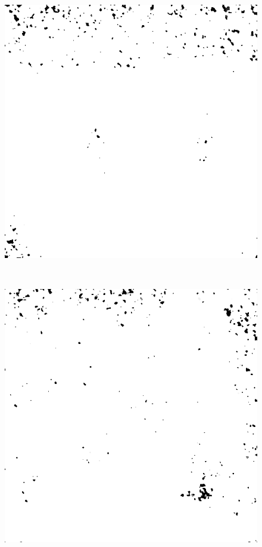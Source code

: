 \begin{figure}[H]
\begin{minipage}[t]{0.3\linewidth}
	\label{fig:car_m15}
\end{minipage}
\begin{minipage}[t]{0.036\linewidth} %
~~
\end{minipage}
\begin{minipage}[t]{0.3\linewidth} %
	\includegraphics[width = 1\linewidth]{gfx/hus/hus_m15.png}
	\label{fig:hus_m15}
\end{minipage}
\begin{minipage}[t]{0.036\linewidth} %
~~
\end{minipage}
\begin{minipage}[t]{0.3\linewidth} %
	\includegraphics[width = 1\linewidth]{gfx/sit/sit_m15.png}

\end{minipage}
\end{figure}
